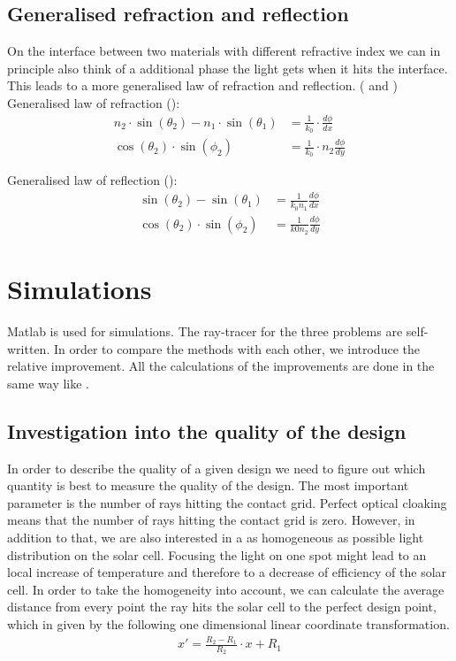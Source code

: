 \subsection{Generalised refraction and reflection \label{Snalls_law_generalised}}
On the interface between two materials with different refractive index we can in principle also think of a additional phase the light gets when it hits the interface. This leads to a more generalised law of refraction and reflection. (\cite{yu2011light} and \cite{yu2014flat})
Generalised law of refraction (\cite{yu2014flat}):
\begin{align*}
 n_2 \cdot \sin(\theta_2) - n_1 \cdot \sin(\theta_1) &= \frac{1}{k_0} \cdot \frac{d \phi}{dx} \\
 \cos(\theta_2) \cdot \sin(\phi_2) &=\frac{1}{k_0} \cdot n_2 \frac{d \phi}{dy}
\end{align*}

Generalised law of reflection (\cite{yu2014flat}):
\begin{align*}
\sin(\theta_2) - \sin(\theta_1) &=\frac{1}{k_0 n_1} \frac{d \phi}{dx} \\
\cos(\theta_2) \cdot \sin(\phi_2) &=\frac{1}{k0 n_2} \frac{d \phi}{dy}
\end{align*}

\section{Simulations}
Matlab is used for simulations. The ray-tracer for the three problems are self-written. In order to compare the methods with each other, we introduce the relative improvement. All the calculations of the improvements are done in the same way like  \cite{schumann2015cloaked}. 
\subsection{Investigation into the quality of the design}
In order to describe the quality of a given design we need to figure out which quantity is best to measure the quality of the design. The most important parameter is the number of rays hitting the contact grid. Perfect optical cloaking means that the number of rays hitting the contact grid is zero. However, in addition to that, we are also interested in a as homogeneous as possible light distribution on the solar cell. Focusing the light on one spot might lead to an local increase of temperature and therefore to a decrease of efficiency of the solar cell. In order to take the homogeneity into account, we can calculate the average distance from every point the ray hits the solar cell to the perfect design point, which in given by the following one dimensional linear coordinate transformation.
\begin{align*}
x' = \frac{R_2 - R_1}{R_2} \cdot x + R_1
\end{align*}
